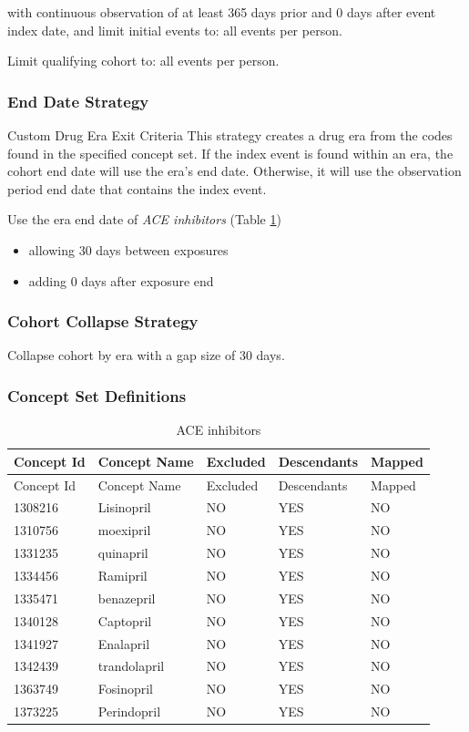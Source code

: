 \documentclass[11pt]{book}
\providecommand{\tightlist}{%
  \setlength{\itemsep}{0pt}\setlength{\parskip}{0pt}}
\theoremstyle{definition}
\theoremstyle{definition}
\theoremstyle{definition}
\theoremstyle{remark}
\begin{document}
with continuous observation of at least 365 days prior and 0 days after
event index date, and limit initial events to: all events per person.

Limit qualifying cohort to: all events per person.

\subsubsection*{End Date Strategy}\label{end-date-strategy}

Custom Drug Era Exit Criteria This strategy creates a drug era from the
codes found in the specified concept set. If the index event is found
within an era, the cohort end date will use the era's end date.
Otherwise, it will use the observation period end date that contains the
index event.

Use the era end date of \emph{ACE inhibitors} (Table
\ref{tab:aceInhibitors})

\begin{itemize}
\tightlist
\item
  allowing 30 days between exposures
\item
  adding 0 days after exposure end
\end{itemize}

\subsubsection*{Cohort Collapse
Strategy}\label{cohort-collapse-strategy}

Collapse cohort by era with a gap size of 30 days.

\subsubsection*{Concept Set Definitions}\label{concept-set-definitions}

\begin{longtable}[]{@{}lllll@{}}
\caption{\label{tab:aceInhibitors} ACE inhibitors}\tabularnewline
\toprule
Concept Id & Concept Name & Excluded & Descendants &
Mapped\tabularnewline
\midrule
\endfirsthead
\toprule
Concept Id & Concept Name & Excluded & Descendants &
Mapped\tabularnewline
\midrule
\endhead
1308216 & Lisinopril & NO & YES & NO\tabularnewline
1310756 & moexipril & NO & YES & NO\tabularnewline
1331235 & quinapril & NO & YES & NO\tabularnewline
1334456 & Ramipril & NO & YES & NO\tabularnewline
1335471 & benazepril & NO & YES & NO\tabularnewline
1340128 & Captopril & NO & YES & NO\tabularnewline
1341927 & Enalapril & NO & YES & NO\tabularnewline
1342439 & trandolapril & NO & YES & NO\tabularnewline
1363749 & Fosinopril & NO & YES & NO\tabularnewline
1373225 & Perindopril & NO & YES & NO\tabularnewline
\bottomrule
\end{longtable}
\end{document}
